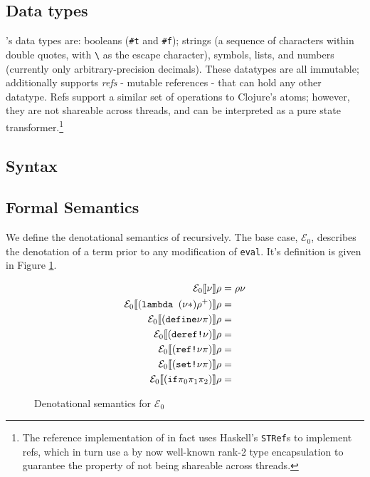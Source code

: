 \subsection{Data types} \rad's data types are: booleans (\texttt{\#t} and
\texttt{\#f}); strings (a sequence of characters within double quotes, with
\texttt{\textbackslash} as the escape character), symbols, lists, and numbers
(currently only arbitrary-precision decimals). These datatypes are all
immutable; additionally \rad supports \textit{refs} - mutable references - that
can hold any other datatype. Refs support a similar set of operations to
Clojure's atoms; however, they are not shareable across threads, and can be
interpreted as a pure state transformer.\footnote{The reference implementation
of \rad in fact uses Haskell's \texttt{STRef}s to implement refs, which in turn
use a by now well-known rank-2 type encapsulation to guarantee the property of
not being shareable across threads.\cite{lazy-functional-state-threads}}

\subsection{Syntax}


\subsection{Formal Semantics} We define the denotational semantics of \rad
recursively. The base case, $\mathcal{E}_{0}$, describes the denotation of a
term prior to any modification of \texttt{eval}. It's definition is given in
Figure \ref{f:denotationalsem0}.


\begin{figure}[H]
\begin{align*}
  \mathcal{E}_{0} \llbracket \nu \rrbracket \rho &= \rho \nu  \\
  \mathcal{E}_{0} \llbracket (\text{\texttt{lambda }} (\nu *) \rho^{+}) \rrbracket \rho &=   \\
  \mathcal{E}_{0} \llbracket (\text{\texttt{define}} \nu \pi ) \rrbracket \rho &=   \\
  \mathcal{E}_{0} \llbracket (\text{\texttt{deref!}} \nu  ) \rrbracket \rho &=   \\
  \mathcal{E}_{0} \llbracket (\text{\texttt{ref!}} \nu \pi) \rrbracket \rho &=   \\
  \mathcal{E}_{0} \llbracket (\text{\texttt{set!}} \nu \pi) \rrbracket \rho &=   \\
  \mathcal{E}_{0} \llbracket (\text{\texttt{if}} \pi_0 \pi_1 \pi_2) \rrbracket \rho &=  
\end{align*}
\caption{Denotational semantics for $\mathcal{E}_{0}$}
\label{f:denotationalsem0}
\end{figure}

